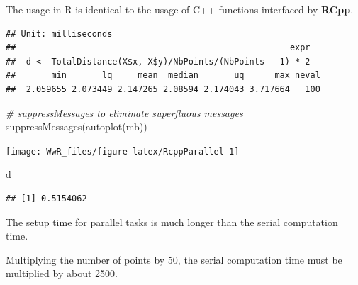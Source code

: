 \documentclass[
  12pt,
  american,
  a4paper,
  extrafontsizes,onecolumn,openright
  ]{memoir}
\newenvironment{Shaded}{\begin{snugshade}}{\end{snugshade}}
\newcommand{\CommentTok}[1]{\textcolor[rgb]{0.56,0.35,0.01}{\textit{#1}}}
\newcommand{\DecValTok}[1]{\textcolor[rgb]{0.00,0.00,0.81}{#1}}
\newcommand{\FunctionTok}[1]{\textcolor[rgb]{0.00,0.00,0.00}{#1}}
\newcommand{\NormalTok}[1]{#1}
\newcommand{\OtherTok}[1]{\textcolor[rgb]{0.56,0.35,0.01}{#1}}
\newcommand{\SpecialCharTok}[1]{\textcolor[rgb]{0.00,0.00,0.00}{#1}}
\newlength{\rf}
\begin{document}
\normalsize

The usage in R is identical to the usage of C++ functions interfaced by \textbf{RCpp}.

\scriptsize

\begin{Shaded}
\end{Shaded}

\begin{verbatim}
## Unit: milliseconds
##                                                      expr
##  d <- TotalDistance(X$x, X$y)/NbPoints/(NbPoints - 1) * 2
##       min       lq     mean  median       uq      max neval
##  2.059655 2.073449 2.147265 2.08594 2.174043 3.717664   100
\end{verbatim}

\begin{Shaded}
\begin{Highlighting}[]
\CommentTok{\# suppressMessages to eliminate superfluous messages}
\FunctionTok{suppressMessages}\NormalTok{(}\FunctionTok{autoplot}\NormalTok{(mb))}
\end{Highlighting}
\end{Shaded}

\begin{center}\texttt{[image: WwR\_files/figure-latex/RcppParallel-1]} \end{center}

\begin{Shaded}
\begin{Highlighting}[]
\NormalTok{d}
\end{Highlighting}
\end{Shaded}

\begin{verbatim}
## [1] 0.5154062
\end{verbatim}

\normalsize

The setup time for parallel tasks is much longer than the serial computation time.

Multiplying the number of points by 50, the serial computation time must be multiplied by about 2500.
\end{document}
